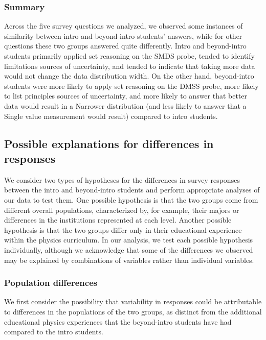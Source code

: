 \documentclass[english,aps,prstper,reprint,showpacs,longbibliography,superscriptaddress,nofootinbib]{revtex4-2}
\begin{document}
\subsubsection{Summary}

Across the five survey questions we analyzed, we observed some instances of similarity between intro and beyond-intro students' answers, while for other questions these two groups answered quite differently. Intro and beyond-intro students primarily applied set reasoning on the SMDS probe, tended to identify limitations sources of uncertainty, and tended to indicate that taking more data would not change the data distribution width. On the other hand, beyond-intro students were more likely to apply set reasoning on the DMSS probe, more likely to list principles sources of uncertainty, and more likely to answer that better data would result in a Narrower distribution (and less likely to answer that a Single value measurement would result) compared to intro students.

\subsection{Possible explanations for differences in responses}

We consider two types of hypotheses for the differences in survey responses between the intro and beyond-intro students and perform appropriate analyses of our data to test them. One possible hypothesis is that the two groups come from different overall populations, characterized by, for example, their majors or differences in the institutions represented at each level. Another possible hypothesis is that the two groups differ only in their educational experience within the physics curriculum. In our analysis, we test each possible hypothesis individually, although we acknowledge that some of the differences we observed may be explained by combinations of variables rather than individual variables.

\subsubsection{Population differences}

We first consider the possibility that variability in responses could be attributable to differences in the populations of the two groups, as distinct from the additional educational physics experiences that the beyond-intro students have had compared to the intro students. 
\end{document}
